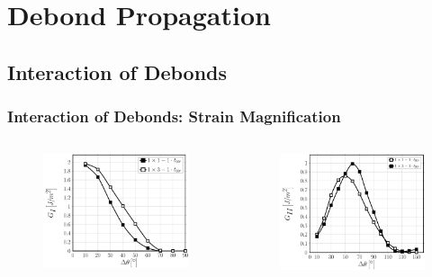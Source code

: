 \documentclass[first,firstsupp,lastsupp,last,hyperref,table]{ETHclass}
\begin{document}
\section{Debond Propagation}

\subsection{Interaction of Debonds}

\begin{frame}
\frametitle{\vspace{0.2cm}\small Interaction of Debonds: Strain Magnification}
\vspace{-.75cm}
\centering
\begin{columns}[c]
\centering
\begin{column}{0.5\textwidth}
\centering
\begin{figure}
\centering
\includegraphics[width=\columnwidth]{nxk-1-vf60-GI-strainmagni1.pdf}
\end{figure}
\end{column}
\begin{column}{0.5\textwidth}
\centering
\begin{figure}
\centering
\includegraphics[width=\columnwidth]{nxk-1-vf60-GII-strainmagni1.pdf}

\end{figure}
\end{column}
\end{columns}
\end{frame}
\end{document}
